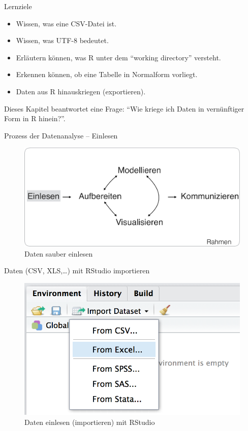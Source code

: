 \begin{frame}{Lernziele}

\begin{itemize}
\tightlist
\item
  Wissen, was eine CSV-Datei ist.
\item
  Wissen, was UTF-8 bedeutet.
\item
  Erläutern können, was R unter dem ``working directory'' versteht.
\item
  Erkennen können, ob eine Tabelle in Normalform vorliegt.
\item
  Daten aus R hinauskriegen (exportieren).
\end{itemize}

Dieses Kapitel beantwortet eine Frage: ``Wie kriege ich Daten in
vernünftiger Form in R hinein?''.

\end{frame}

\begin{frame}{Prozess der Datenanalyse -- Einlesen}

\begin{figure}

{\centering \includegraphics[width=0.8\linewidth]{../images/tidy/Einlesen} 

}

\caption{Daten sauber einlesen}\label{fig:step-Einlesen}
\end{figure}

\end{frame}

\begin{frame}{Daten (CSV, XLS,\ldots{}) mit RStudio importieren}

\begin{figure}

{\centering \includegraphics[width=0.5\linewidth]{../images/tidy/import_RStudio} 

}

\caption{Daten einlesen (importieren) mit RStudio}\label{fig:data-import-RStudio}
\end{figure}

\end{frame}

